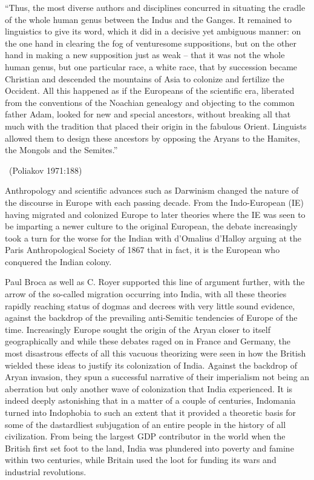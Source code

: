 \begin{myquote}
“Thus, the most diverse authors and disciplines concurred in situating the cradle of the whole human genus between the Indus and the Ganges. It remained to linguistics to give its word, which it did in a decisive yet ambiguous manner: on the one hand in clearing the fog of venturesome suppositions, but on the other hand in making a new supposition just as weak -- that it was not the whole human genus, but one particular race, a white race, that by succession became Christian and descended the mountains of Asia to colonize and fertilize the Occident. All this happened as if the Europeans of the scientific era, liberated from the conventions of the Noachian genealogy and objecting to the common father Adam, looked for new and special ancestors, without breaking all that much with the tradition that placed their origin in the fabulous Orient. Linguists allowed them to design these ancestors by opposing the Aryans to the Hamites, the Mongols and the Semites.”

~\hfill (Poliakov 1971:188)
\end{myquote}

Anthropology and scientific advances such as Darwinism changed the nature of the discourse in Europe with each passing decade. From the Indo-European (IE) having migrated and colonized Europe to later theories where the IE was seen to be imparting a newer culture to the original European, the debate increasingly took a turn for the worse for the Indian with d'Omalius d'Halloy arguing at the Paris Anthropological Society of 1867 that in fact, it is the European who conquered the Indian colony.

Paul Broca as well as C. Royer supported this line of argument further, with the arrow of the so-called migration occurring into India, with all these theories rapidly reaching status of dogmas and decrees with very little sound evidence, against the backdrop of the prevailing anti-Semitic tendencies of Europe of the time. Increasingly Europe sought the origin of the Aryan closer to itself geographically and while these debates raged on in France and Germany, the most disastrous effects of all this vacuous theorizing were seen in how the British wielded these ideas to justify its colonization of India. Against the backdrop of Aryan invasion, they spun a successful narrative of their imperialism not being an aberration but only another wave of colonization that India experienced. It is indeed deeply astonishing that in a matter of a couple of centuries, Indomania turned into Indophobia to such an extent that it provided a theoretic basis for some of the dastardliest subjugation of an entire people in the history of all civilization. From being the largest GDP contributor in the world when the British first set foot to the land, India was plundered into poverty and famine within two centuries, while Britain used the loot for funding its wars and industrial revolutions.


